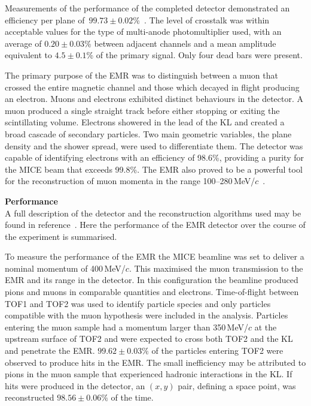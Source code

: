 Measurements of the performance of the completed detector demonstrated
an efficiency per plane
of~$99.73\pm0.02$\%~\cite{2016JInst..11T10007,Drielsma:2017doj}.
The level of crosstalk was within acceptable values for the type of
multi-anode photomultiplier used, with an average of $0.20\pm0.03$\%
between adjacent channels and a mean amplitude
equivalent to $4.5\pm0.1$\% of the primary signal.
Only four dead bars were present.

The primary purpose of the EMR was to distinguish between a muon that crossed  the entire magnetic channel and those which decayed in flight producing an electron.
Muons and electrons exhibited distinct behaviours in the detector.
A muon produced a single straight track before either stopping or
exiting the scintillating volume.
Electrons showered in the lead of the KL and created a broad cascade
of secondary particles.
Two main geometric variables, the plane density and the shower spread,
were used to differentiate them.
The detector was capable of identifying electrons with an efficiency
of 98.6\%, providing a purity for the MICE beam that exceeds
99.8\%.
The EMR also proved to be a powerful tool for the reconstruction of
muon momenta in the range
100--280\,MeV/$c$~\cite{2015JInst..10P2012A}.  \\

\newpage

\noindent\textbf{Performance} \\
\noindent
A full description of the detector and the reconstruction algorithms
used may be found in reference~\cite{2015JInst..10P2012A}.
Here the performance of the EMR detector over the course of the
experiment is summarised.

To measure the performance of the EMR the MICE beamline was set to
deliver a nominal momentum of 400\,MeV/$c$. This maximised the muon
transmission to the EMR and its range in the detector.
In this configuration the beamline produced pions and muons in
comparable quantities and electrons.
Time-of-flight between TOF1 and TOF2 was used to identify particle
species and only particles compatible with the muon hypothesis were
included in the analysis.
Particles entering the muon sample had a momentum larger than
350\,MeV/$c$ at the upstream surface of TOF2 and were expected to
cross both TOF2 and the KL and penetrate the EMR.
$99.62\pm0.03\%$ of the particles entering TOF2 were observed to produce
hits in the EMR.
The small inefficiency may be attributed to pions in the muon sample
that experienced hadronic interactions in the KL.
If hits were produced in the detector, an $(x,y)$ pair, defining a
space point, was reconstructed $98.56\pm0.06\%$ of the time.

